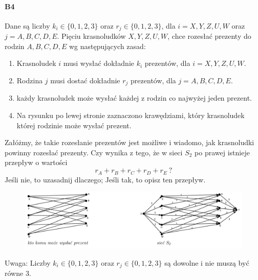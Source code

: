 \paragraph{B4} Dane są liczby $k_i\in \{0,1,2,3\}$ oraz $r_j\in \{0,1,2,3\}$, dla $i = X,Y,Z,U,W$ oraz $j = A,B,C,D,E$. Pięciu krasnoludków $X, Y , Z, U, W$, chce rozesłać prezenty do rodzin $A, B, C, D, E$ wg następujących zasad:
\begin{enumerate}[label=\alph*)]
\item Krasnoludek $i$ musi wysłać dokładnie $k_i$ prezentów, dla $i = X,Y,Z,U,W$.
\item Rodzina $j$ musi dostać dokładnie $r_j$ prezentów, dla $j = A,B,C,D,E$.
\item każdy krasnoludek może wysłać każdej z rodzin co najwyżej jeden prezent.
\item Na rysunku po lewej stronie zaznaczono krawędziami, który krasnoludek której rodzinie może wysłać prezent.
\end{enumerate}
Załóżmy, że takie rozesłanie prezentów jest możliwe i wiadomo, jak krasnoludki powinny rozesłać prezenty. Czy wynika z tego, że w sieci $S_2$ po prawej istnieje przepływ o wartości $$r_A + r_B + r_C + r_D + r_E\ ?$$ Jeśli nie, to uzasadnij dlaczego; Jeśli tak, to opisz ten przepływ.
\begin{figure}[H]
\centering
\includegraphics[width=.9\textwidth]{img/7_B4}
\end{figure}

Uwaga: Liczby $k_i \in \{0, 1, 2, 3\}$ oraz $r_j \in \{0, 1, 2, 3\}$ są dowolne i nie muszą być równe $3$.

